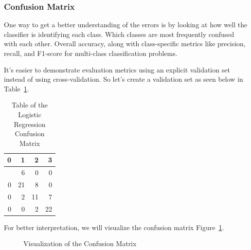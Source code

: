 \documentclass[
  letterpaper,
  DIV=11,
  numbers=noendperiod]{scrartcl}
\begin{document}
\subsubsection{Confusion Matrix}\label{confusion-matrix}

One way to get a better understanding of the errors is by looking at how
well the classifier is identifying each class. Which classes are most
frequently confused with each other. Overall accuracy, along with
class-specific metrics like precision, recall, and F1-score for
multi-class classification problems.

It's easier to demonstrate evaluation metrics using an explicit
validation set instead of using cross-validation. So let's create a
validation set as seen below in Table~\ref{tbl-confusion-matrix}.

\begin{longtable}[]{@{}rrrr@{}}

\caption{\label{tbl-confusion-matrix}Table of the Logistic Regression
Confusion Matrix}

\tabularnewline

\toprule\noalign{}
0 & 1 & 2 & 3 \\
\midrule\noalign{}
\endhead
\bottomrule\noalign{}
\endlastfoot
0 & 6 & 0 & 0 \\
0 & 21 & 8 & 0 \\
0 & 2 & 11 & 7 \\
0 & 0 & 2 & 22 \\

\end{longtable}

For better interpretation, we will visualize the confusion matrix
Figure~\ref{fig-cm}.

\begin{figure}[H]


\caption{\label{fig-cm}Visualization of the Confusion Matrix}

\end{figure}%
\end{document}
